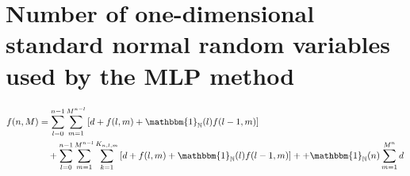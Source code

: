 \documentclass[a4paper,12pt]{article}
\providecommand{\1}{\mathbbm{1}}
\providecommand{\N}{\mathbb{N}}
\newcommand{\Zz}{Z}
\DeclarePairedDelimiter{\pr}()
\DeclarePairedDelimiter{\br}[]
\newcommand{\bpr}[1]{\pr[\big]{#1}}
\newcommand{\bbpr}[1]{\pr[\Big]{#1}}
\newcommand{\bbbbr}[1]{\br[\bigg]{#1}}
\newcommand{\bbbbbr}[1]{\br[\Bigg]{#1}}
\newcommand{\dindex}{\mathfrak{i}}
\begin{document}
\section{Number of one-dimensional standard normal random variables used by the MLP method}
\begin{equation}
	\begin{split}
    f(n,M) &= \sum_{l=0}^{n-1}
		\sum_{m=1}^{M^{n-l}}\left[
    d %
    + f(l,m)
    + \mathbbm{1}_\N(l) f(l-1,m)\right] \\
    &\quad +
    \sum_{l=0}^{n-1}
		\sum_{m=1}^{M^{n-l}} 
		\sum_{k=1}^{K_{n,l,m}}\left[
		d
    + f(l,m)
    + \mathbbm{1}_\N(l) f(l-1,m)\right] +
    + \mathbbm{1}_\N(n) \sum_{m=1}^{M^n} d
	\end{split}
\end{equation}
\end{document}
